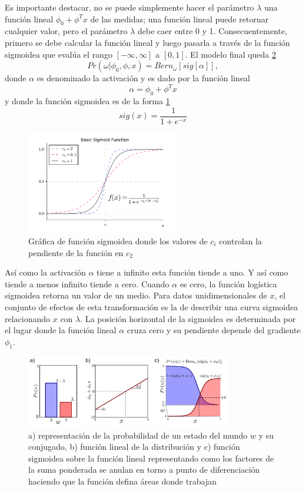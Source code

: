 \documentclass[letter,12pt]{report}
\begin{document}
Es importante destacar, no se puede simplemente hacer el parámetro $\lambda$ una función
lineal $\phi_0+\phi^Tx$ de las medidas; una función lineal puede retornar cualquier
valor, pero el parámetro $\lambda$ debe caer entre 0 y 1. Consecuentemente, primero
se debe calcular la función lineal y luego pasarla a través de la función sigmoidea que
evalúa el rango $[-\infty,\infty]$ a $[0, 1]$. El modelo final queda \ref{fig:logistic}
$$Pr(\omega|\phi_0, \phi, x)=Bern_\omega [sig[\alpha]],$$
donde $\alpha$ es denominado la activación y es dado por la función lineal
$$\alpha=\phi_0+\phi^Tx$$
y donde la función sigmoidea \cite{Sigmoid} es de la forma \ref{fig:sigmoid}
$$sig(x)=\frac{1}{1 + e^{-x}}$$

\begin{figure}[H]
    \centering
    \includegraphics[width=0.6\textwidth]{sigmoid}
    \caption{Gráfica de función sigmoidea donde los valores de $c_i$ controlan la pendiente
    de la función en $c_2$}
    \label{fig:sigmoid}
\end{figure}

Así como la activación $\alpha$ tiene a infinito esta función tiende a uno. Y así como
tiende a menos infinito tiende a cero. Cuando $\alpha$ es cero, la función logística
sigmoidea retorna un valor de un medio. Para datos unidimensionales de $x$, el conjunto
de efectos de esta transformación es la de describir una curva sigmoidea relacionando $x$
con $\lambda$. La posición horizontal de la sigmoidea es determinada por el lugar donde
la función lineal $\alpha$ cruza cero y su pendiente depende del gradiente $\phi_1$.

\begin{figure}[H]
    \centering
    \includegraphics[width=0.8\textwidth]{logistic}
    \caption{a) representación de la probabilidad de un estado del mundo $w$ y su
        conjugado, b) función lineal de la distribución y c) función sigmoidea sobre la
        función lineal representando como los factores de la suma ponderada se anulan en torno a
    punto de diferenciación haciendo que la función defina áreas donde trabajan}
    \label{fig:logistic}
\end{figure}
\end{document}
